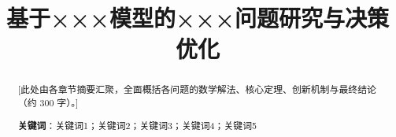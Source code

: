 \documentclass[12pt,a4paper]{article}
\title{\textbf{\LARGE 基于×××模型的×××问题研究与决策优化}}
\begin{document}
\maketitle

\begin{abstract}
[此处由各章节摘要汇聚，全面概括各问题的数学解法、核心定理、创新机制与最终结论（约 300 字）。]

\noindent\textbf{关键词}：关键词1；关键词2；关键词3；关键词4；关键词5
\end{abstract}

\newpage











\end{document}
